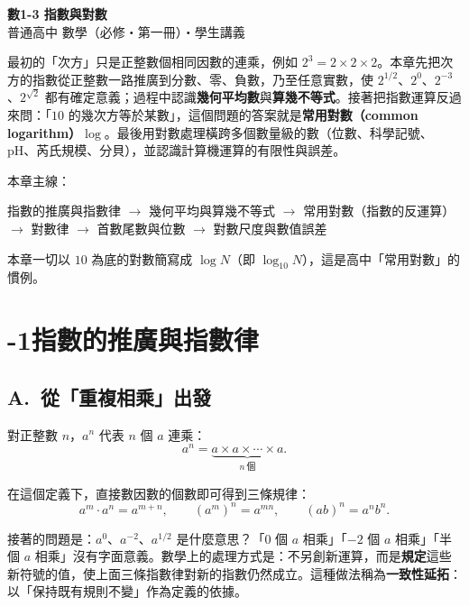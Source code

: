 \documentclass[11pt]{article}
\begin{document}
\begin{center}
{\sffamily\Huge\bfseries 數1-3 指數與對數}\\[3pt]
{\sffamily\large 普通高中 數學（必修・第一冊）・學生講義}
\end{center}
\vspace{0.6em}

最初的「次方」只是正整數個相同因數的連乘，例如 $2^3=2\times2\times2$。本章先把次方的指數從正整數一路推廣到分數、零、負數，乃至任意實數，使 $2^{1/2}$、$2^{0}$、$2^{-3}$、$2^{\sqrt2}$ 都有確定意義；過程中認識\textbf{幾何平均數}與\textbf{算幾不等式}。接著把指數運算反過來問：「$10$ 的幾次方等於某數」，這個問題的答案就是\textbf{常用對數（common logarithm）}$\log$。最後用對數處理橫跨多個數量級的數（位數、科學記號、pH、芮氏規模、分貝），並認識計算機運算的有限性與誤差。

\medskip
本章主線：

\begin{center}
指數的推廣與指數律 $\rightarrow$ 幾何平均與算幾不等式 $\rightarrow$ 常用對數（指數的反運算）$\rightarrow$ 對數律 $\rightarrow$ 首數尾數與位數 $\rightarrow$ 對數尺度與數值誤差
\end{center}

\medskip
本章一切以 $10$ 為底的對數簡寫成 $\log N$（即 $\log_{10}N$），這是高中「常用對數」的慣例。

\section*{-1\quad 指數的推廣與指數律}

\subsection*{\sffamily A.\ 從「重複相乘」出發}

對正整數 $n$，$a^n$ 代表 $n$ 個 $a$ 連乘：
$$a^n=\underbrace{a\times a\times\cdots\times a}_{n\ \text{個}}.$$

在這個定義下，直接數因數的個數即可得到三條規律：
$$a^m\cdot a^n=a^{m+n},\qquad (a^m)^n=a^{mn},\qquad (ab)^n=a^n b^n.$$

接著的問題是：$a^0$、$a^{-2}$、$a^{1/2}$ 是什麼意思？「$0$ 個 $a$ 相乘」「$-2$ 個 $a$ 相乘」「半個 $a$ 相乘」沒有字面意義。數學上的處理方式是：不另創新運算，而是\textbf{規定}這些新符號的值，使上面三條指數律對新的指數仍然成立。這種做法稱為\textbf{一致性延拓}：以「保持既有規則不變」作為定義的依據。
\end{document}
